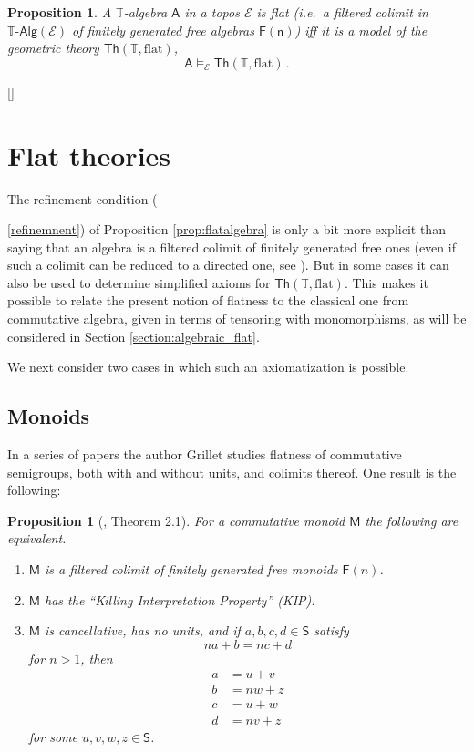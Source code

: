 \documentclass[12pt]{article}
\newcommand{\ednote}[1]{[\textit{\color{red}{#1}}]} %
\newcommand{\T}{\ensuremath{\mathbb{T}}}
\newcommand{\EE}{\ensuremath{\mathcal{E}}}
\newcommand{\TAlg}{\ensuremath{\T\text{-}\mathsf{Alg}}}
\newcommand{\alg}[1]{\ensuremath{\mathsf{#1}}}
\newcommand{\algA}{\ensuremath{\mathsf{A}}}
\newtheorem{proposition}[theorem]{Proposition}
\theoremstyle{remark}
\theoremstyle{definition}
\begin{document}
\begin{proposition}
A $\T$-algebra $\algA$ in a topos $\EE$ is flat (i.e.\ a filtered colimit in $\TAlg(\EE)$ of finitely generated free algebras $\alg{F(n)}$) iff it is a model of the geometric theory $\mathsf{Th}(\T,\mathrm{flat})$,
\[
\algA\models_{\EE} \mathsf{Th}(\T,\mathrm{flat})\,.
\]
\end{proposition}

\ednote{fill in the proof, which is standard.}

\section{Flat theories}

The refinement condition ({\ref{refinemnent}) of Proposition \ref{prop:flatalgebra} is only a bit more explicit than saying that an algebra is a filtered colimit of finitely generated free ones (even if such a colimit can be reduced to a directed one, see \cite{AR:}).  But in some cases it can also be used to determine simplified axioms for $\mathsf{Th}(\T,\mathrm{flat})$.  This makes it possible to relate the present notion of flatness to the classical one from commutative algebra, given in terms of tensoring with monomorphisms, as will be considered in Section \ref{section:algebraic_flat}.

We next consider two cases in which such an axiomatization is possible.

\subsection{Monoids}

In a series of papers \cite{Grillet:69a,Grillet:69b, Grillet:76} the author Grillet studies flatness of commutative semigroups, both with and without units, and colimits thereof.  One result is the following:

\begin{proposition}[\cite{Grillet:76}, Theorem 2.1]
For a commutative monoid $\alg{M}$ the following are equivalent.
%
\begin{enumerate}
%
\item $\alg{M}$ is a filtered colimit of finitely generated free monoids $\alg{F}(n)$.
%
\item $\alg{M}$ has the ``Killing Interpretation Property'' (KIP).
%
\item $\alg{M}$ is \emph{cancellative}, has \emph{no units}, and if $a,b,c,d \in \alg{S}$ satisfy $$na + b = nc+d$$ for $n > 1$, then
\begin{align*}
a&= u + v\\
b &= nw+z\\
c &= u+w\\
d &= nv + z
\end{align*}
for some $u, v, w, z \in \alg{S}$. 
\end{enumerate}
%
\end{proposition}

}
\end{document}

